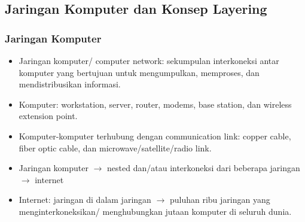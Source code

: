 \documentclass[pdflatex,compress]{beamer}
\begin{document}
\subsection{Jaringan Komputer dan Konsep Layering}

\begin{frame}
	\frametitle{Jaringan Komputer}
	\begin{itemize}
		\item Jaringan komputer/ computer network: sekumpulan interkoneksi antar komputer yang bertujuan untuk mengumpulkan, memproses, dan mendistribusikan informasi.
		\item Komputer: workstation, server, router, modems, base station, dan wireless extension point.
		\item Komputer-komputer terhubung dengan communication link: copper cable, fiber optic cable, dan microwave/satellite/radio link.
		\item Jaringan komputer $\rightarrow$ nested dan/atau interkoneksi dari beberapa jaringan $\rightarrow$ internet
		\item Internet: jaringan di dalam jaringan $\rightarrow$ puluhan ribu jaringan yang menginterkoneksikan/ menghubungkan jutaan komputer di seluruh dunia.
	\end{itemize}
\end{frame}
\end{document}
